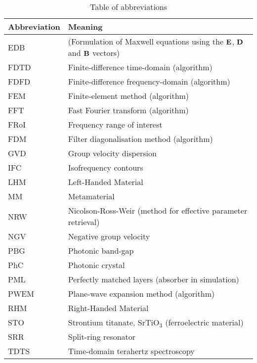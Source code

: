 \begin{table}[ht]   \caption{Table of abbreviations}  \label{tb_shortcuts} \centering 
\begin{tabular}{ll}
 \toprule
Abbreviation & Meaning	\\
 \hline
EDB		& (Formulation of Maxwell equations using the $\mathbf{E}$, $\mathbf{D}$ and $\mathbf{B}$ vectors)\\
FDTD 		& Finite-difference time-domain (algorithm)\\
FDFD 		& Finite-difference frequency-domain (algorithm)\\
FEM 		& Finite-element method (algorithm)\\
FFT 		& Fast Fourier transform (algorithm)\\
FRoI 		& Frequency range of interest\\
FDM 		& Filter diagonalisation method (algorithm)\\
GVD 		& Group velocity dispersion \\
IFC		& Isofrequency contours\\
LHM		& Left-Handed Material\\ %
MM		& Metamaterial\\
NRW 		& Nicolson-Ross-Weir (method for effective parameter retrieval)\\
NGV 		& Negative group velocity\\
PBG		& Photonic band-gap\\
PhC 		& Photonic crystal\\
PML 		& Perfectly matched layers (absorber in simulation)\\
PWEM 		& Plane-wave expansion method (algorithm)\\
RHM 		& Right-Handed Material\\ %
STO		& Strontium titanate, SrTiO$_3$ (ferroelectric material)\\
SRR		& Split-ring resonator\\
TDTS 		& Time-domain terahertz spectroscopy\\
 \bottomrule
 \end{tabular} \end{table}

